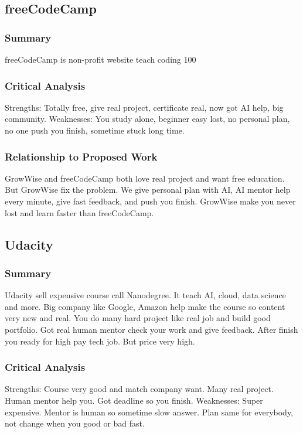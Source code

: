 \documentclass{FastFyp}
\begin{document}
\subsection{freeCodeCamp}

\subsubsection{Summary}
freeCodeCamp \cite{freecodecamp2023} is non-profit website teach coding 100%

\subsubsection{Critical Analysis}
Strengths: Totally free, give real project, certificate real, now got AI help, big community.  
Weaknesses: You study alone, beginner easy lost, no personal plan, no one push you finish, sometime stuck long time.

\subsubsection{Relationship to Proposed Work}
GrowWise and freeCodeCamp both love real project and want free education. But GrowWise fix the problem. We give personal plan with AI, AI mentor help every minute, give fast feedback, and push you finish. GrowWise make you never lost and learn faster than freeCodeCamp.


\subsection{Udacity}

\subsubsection{Summary}
Udacity \cite{udacity2023} sell expensive course call Nanodegree. It teach AI, cloud, data science and more. Big company like Google, Amazon help make the course so content very new and real. You do many hard project like real job and build good portfolio. Got real human mentor check your work and give feedback. After finish you ready for high pay tech job. But price very high.

\subsubsection{Critical Analysis}
Strengths: Course very good and match company want. Many real project. Human mentor help you. Got deadline so you finish.  
Weaknesses: Super expensive. Mentor is human so sometime slow answer. Plan same for everybody, not change when you good or bad fast.
\end{document}
